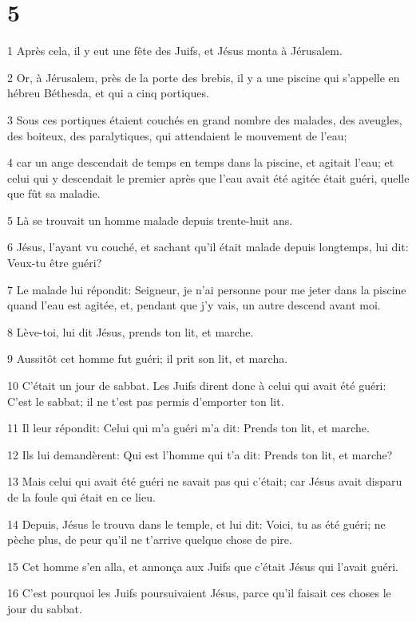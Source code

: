 \chapter{5}

\par 1 Après cela, il y eut une fête des Juifs, et Jésus monta à Jérusalem.
\par 2 Or, à Jérusalem, près de la porte des brebis, il y a une piscine qui s'appelle en hébreu Béthesda, et qui a cinq portiques.
\par 3 Sous ces portiques étaient couchés en grand nombre des malades, des aveugles, des boiteux, des paralytiques, qui attendaient le mouvement de l'eau;
\par 4 car un ange descendait de temps en temps dans la piscine, et agitait l'eau; et celui qui y descendait le premier après que l'eau avait été agitée était guéri, quelle que fût sa maladie.
\par 5 Là se trouvait un homme malade depuis trente-huit ans.
\par 6 Jésus, l'ayant vu couché, et sachant qu'il était malade depuis longtemps, lui dit: Veux-tu être guéri?
\par 7 Le malade lui répondit: Seigneur, je n'ai personne pour me jeter dans la piscine quand l'eau est agitée, et, pendant que j'y vais, un autre descend avant moi.
\par 8 Lève-toi, lui dit Jésus, prends ton lit, et marche.
\par 9 Aussitôt cet homme fut guéri; il prit son lit, et marcha.
\par 10 C'était un jour de sabbat. Les Juifs dirent donc à celui qui avait été guéri: C'est le sabbat; il ne t'est pas permis d'emporter ton lit.
\par 11 Il leur répondit: Celui qui m'a guéri m'a dit: Prends ton lit, et marche.
\par 12 Ils lui demandèrent: Qui est l'homme qui t'a dit: Prends ton lit, et marche?
\par 13 Mais celui qui avait été guéri ne savait pas qui c'était; car Jésus avait disparu de la foule qui était en ce lieu.
\par 14 Depuis, Jésus le trouva dans le temple, et lui dit: Voici, tu as été guéri; ne pèche plus, de peur qu'il ne t'arrive quelque chose de pire.
\par 15 Cet homme s'en alla, et annonça aux Juifs que c'était Jésus qui l'avait guéri.
\par 16 C'est pourquoi les Juifs poursuivaient Jésus, parce qu'il faisait ces choses le jour du sabbat.
